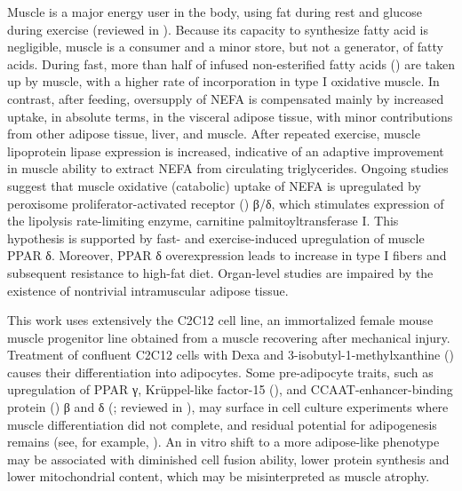 \documentclass[12pt,english]{report}\usepackage[]{graphicx}\usepackage[]{color}
\begin{document}
Muscle is a major energy user in the body, using fat during rest and
glucose during exercise (reviewed in \citep{berg2002each,wasserman2009four}).
Because its capacity to synthesize fatty acid is negligible, muscle
is a consumer and a minor store, but not a generator, of fatty acids.
During fast, more than half of infused non-esterified fatty acids
() are taken up by
muscle, with a higher rate of incorporation in type I oxidative muscle\citep{li1995triglyceride}.
In contrast, after feeding, oversupply of NEFA is compensated mainly
by increased uptake, in absolute terms, in the visceral adipose tissue,
with minor contributions from other adipose tissue, liver, and muscle.
After repeated exercise, muscle lipoprotein lipase expression is increased,
indicative of an adaptive improvement in muscle ability to extract
NEFA from circulating triglycerides\citep{seip1997induction}. Ongoing
studies suggest that muscle oxidative (catabolic) uptake of NEFA is
upregulated by peroxisome proliferator-activated receptor ()
β/δ, which stimulates expression of the lipolysis rate-limiting enzyme,
carnitine palmitoyltransferase I\citep{wang2003peroxisome-proliferator-activated,narkar2008ampk}.
This hypothesis is supported by fast- and exercise-induced upregulation
of muscle PPAR δ\citep{watt2004suppression,holst2003nutritional}.
Moreover, PPAR δ overexpression leads to increase in type I fibers
and subsequent resistance to high-fat diet\citep{wang2003peroxisome-proliferator-activated}.
Organ-level studies are impaired by the existence of nontrivial intramuscular
adipose tissue.

This work uses extensively the C2C12 cell line, an immortalized female
mouse muscle progenitor line obtained from a muscle recovering after
mechanical injury. Treatment of confluent C2C12 cells with Dexa and
3-isobutyl-1-methylxanthine ()
causes their differentiation into adipocytes\citep{mancini2007fmip}.
Some pre-adipocyte traits, such as upregulation of PPAR γ, Krüppel-like
factor-15 (), and CCAAT-enhancer-binding
protein () β
and δ (\citep{mori2005role}; reviewed in \citep{cristancho2011forming}),
may surface in cell culture experiments where muscle differentiation
did not complete, and residual potential for adipogenesis remains
(see, for example, \citep{itoigawa2010hypoxia}). An in vitro shift
to a more adipose-like phenotype may be associated with diminished
cell fusion ability, lower protein synthesis and lower mitochondrial
content, which may be misinterpreted as muscle atrophy.
\end{document}
